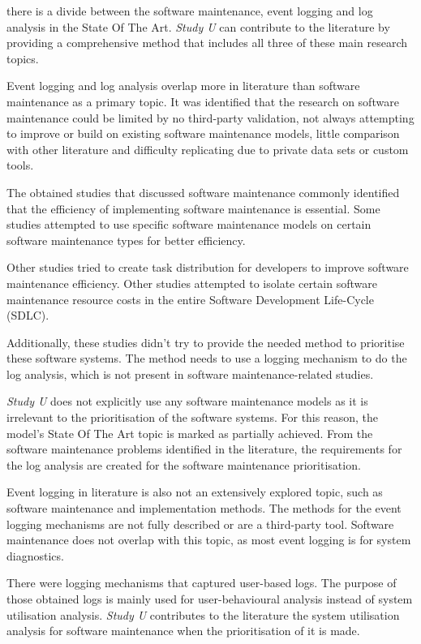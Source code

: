  there is a divide between the software maintenance, event logging and log analysis in the State Of The Art. \textit{Study U} can contribute to the literature by providing a comprehensive method that includes all three of these main research topics. \par Event logging and log analysis overlap more in literature than software maintenance as a primary topic. It was identified that the research on software maintenance could be limited by no third-party validation, not always attempting to improve or build on existing software maintenance models, little comparison with other literature and difficulty replicating due to private data sets or custom tools.\par The obtained studies that discussed software maintenance commonly identified that the efficiency of implementing software maintenance is essential. Some studies attempted to use specific software maintenance models on certain software maintenance types for better efficiency. \par Other studies tried to create task distribution for developers to improve software maintenance efficiency. Other studies attempted to isolate certain software maintenance resource costs in the entire Software Development Life-Cycle (SDLC).\par Additionally, these studies didn't try to provide the needed method to prioritise these software systems. The method needs to use a logging mechanism to do the log analysis, which is not present in software maintenance-related studies.\par \textit{Study U} does not explicitly use any software maintenance models as it is irrelevant to the prioritisation of the software systems. For this reason, the model's State Of The Art topic is marked as partially achieved. From the software maintenance problems identified in the literature, the requirements for the log analysis are created for the software maintenance prioritisation. \par Event logging in literature is also not an extensively explored topic, such as software maintenance and implementation methods. The methods for the event logging mechanisms are not fully described or are a third-party tool. Software maintenance does not overlap with this topic, as most event logging is for system diagnostics.\par There were logging mechanisms that captured user-based logs. The purpose of those obtained logs is mainly used for user-behavioural analysis instead of system utilisation analysis. \textit{Study U} contributes to the literature the system utilisation analysis for software maintenance when the prioritisation of it is made.

